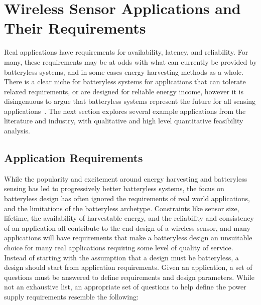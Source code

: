 
\section{Wireless Sensor Applications and Their Requirements}
\label{sec:background:app}
Real applications have requirements for availability, latency, and reliability. For many, these requirements may be at odds with what can currently be provided by batteryless systems, and in some cases energy harvesting methods as a whole.
There is a clear niche for batteryless systems for applications that can tolerate relaxed requirements, or are designed for reliable energy income, however it is disingenuous to argue that batteryless systems represent the future for all sensing applications~\cite{hester2017future}.
The next section explores several example applications from the literature and industry, with qualitative and high level quantitative feasibility analysis.


\subsection{Application Requirements}
\label{sec:background:background_reqs}
While the popularity and excitement around energy harvesting and batteryless sensing has led to progressively better batteryless systems, the focus on batteryless design has often ignored the requirements of real world applications, and the limitations of the batteryless archetype.
Constraints like sensor size, lifetime, the availability of harvestable energy, and the reliability and consistency of an application all contribute to the end design of a wireless sensor, and many applications will have requirements that make a batteryless design an unsuitable choice for many real applications requiring some level of quality of service.
Instead of starting with the assumption that a design must be batteryless, a design should start from application requirements. Given an application, a set of questions must be answered to define requirements and design parameters.
While not an exhaustive list, an appropriate set of questions to help define the power supply requirements resemble the following:

